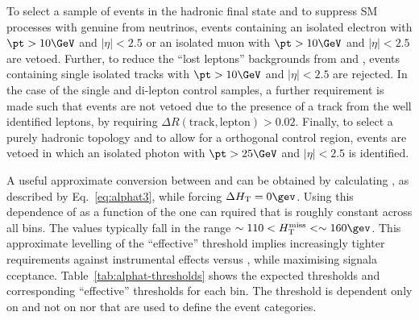 To select a sample of events in the hadronic final state and to suppress SM processes with genuine \met from neutrinos, events
containing an isolated electron with $\pt > 10\GeV$ and $|\eta| < 2.5$ or an isolated muon with $\pt > 10\GeV$ and $|\eta| < 2.5$ are
vetoed. Further, to reduce the ``lost leptons'' backgrounds from \wj and \ttbar, events containing single isolated tracks with $\pt >
10\GeV$ and $|\eta| < 2.5$ are rejected. In the case of the single and di-lepton control samples, a further
requirement is made such that events are not vetoed due to the presence of a track from the well identified leptons, by requiring
$\Delta R(\textrm{track},\textrm{lepton}) > 0.02$. Finally, to select a purely hadronic topology and to allow for a 
orthogonal control region, events are vetoed in which an isolated photon with $\pt > 25\GeV$ and $|\eta| < 2.5$ is identified.



A useful approximate conversion between \alphat and \mht can be obtained by calculating \alphat, as described by Eq.~\ref{eq:alphat3}, 
while forcing $\dht = 0\gev$. Using this dependence of \alphat as a function of the \HT one can rquired that \mht is roughly constant across all \HT bins. 
The values typically fall in the range $\sim110 < \mht < \sim160\gev$. This approximate levelling of the ``effective'' \mht threshold implies
increasingly tighter requirements against instrumental effects versus \HT, while maximising signala cceptance. 
Table~\ref{tab:alphat-thresholds} shows the expected \alphat thresholds and corresponding ``effective'' \mht thresholds for each \HT bin. 
The \alphat threshold is dependent only on \HT and not on \njet nor \nb that are used to define the event categories.


